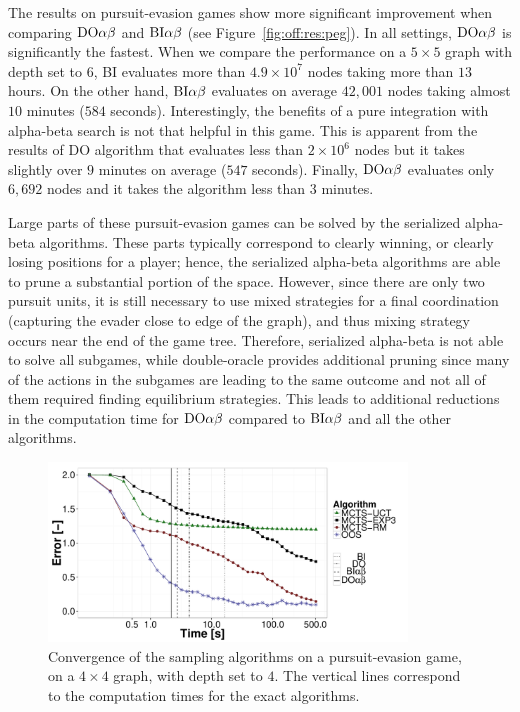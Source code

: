 The results on pursuit-evasion games show more significant improvement when comparing $\textrm{DO}\alpha\beta$ and $\textrm{BI}\alpha\beta$ (see Figure~\ref{fig:off:res:peg}). In all settings, $\textrm{DO}\alpha\beta$ is significantly the fastest. When we compare the performance on a $5\times5$ graph with depth set to $6$, \textsc{BI} evaluates more than $4.9\times10^7$ nodes taking more than $13$ hours. On the other hand, $\textrm{BI}\alpha\beta$ evaluates on average $42,001$ nodes taking almost $10$ minutes ($584$ seconds). Interestingly, the benefits of a pure integration with alpha-beta search is not that helpful in this game.
This is apparent from the results of \textsc{DO} algorithm that evaluates less than $2\times10^6$ nodes but it takes slightly over $9$ minutes on average ($547$ seconds). Finally, $\textrm{DO}\alpha\beta$ evaluates only $6,692$ nodes and it takes the algorithm less than $3$ minutes.

Large parts of these pursuit-evasion games can be solved by the serialized alpha-beta algorithms.
These parts typically correspond to clearly winning, or clearly losing positions for a player; hence, the serialized alpha-beta algorithms are able to prune a substantial portion of the space.
However, since there are only two pursuit units, it is still necessary to use mixed strategies for a final coordination (capturing the evader close to edge of the graph), and thus mixing strategy occurs near the end of the game tree.
Therefore, serialized alpha-beta is not able to solve all subgames, while double-oracle provides additional pruning since many of the actions in the subgames are leading to the same outcome and not all of them required finding equilibrium strategies.
This leads to additional reductions in the computation time for $\textrm{DO}\alpha\beta$ compared to $\textrm{BI}\alpha\beta$ and all the other algorithms.%

\begin{figure}[t!]
\centering
\includegraphics[width=0.85\textwidth]{figures/convergence-peg.pdf}
\caption{Convergence of the sampling algorithms on a pursuit-evasion game, on a $4\times4$ graph, with depth set to $4$. The vertical lines correspond to the computation times for the exact algorithms.} \label{fig:off:conv:peg}
\end{figure}

